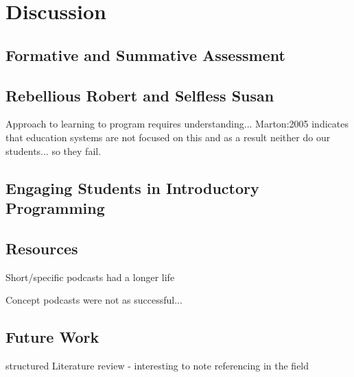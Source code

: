 
\chapter{Discussion} %
\label{cha:discussion}

\section{Formative and Summative Assessment} %
\label{sec:formative_and_summative_assessment}


\section{Rebellious Robert and Selfless Susan} %
\label{sec:rebellious_robert_and_selfless_susan}

Approach to learning to program requires understanding... Marton:2005 indicates that education systems are not focused on this and as a result neither do our students... so they fail.


\section{Engaging Students in Introductory Programming} %
\label{sec:engaging_students_in_introductory_programming}


\section{Resources} %
\label{sec:resources}

Short/specific podcasts had a longer life

Concept podcasts were not as successful... 



\section{Future Work} %
\label{sec:future_work}

structured Literature review - interesting to note referencing in the field


